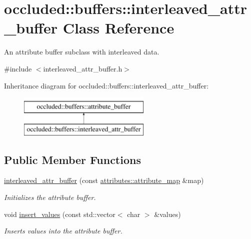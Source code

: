 \hypertarget{classoccluded_1_1buffers_1_1interleaved__attr__buffer}{\section{occluded\+:\+:buffers\+:\+:interleaved\+\_\+attr\+\_\+buffer Class Reference}
\label{classoccluded_1_1buffers_1_1interleaved__attr__buffer}
}


An attribute buffer subclass with interleaved data.  




{\ttfamily \#include $<$interleaved\+\_\+attr\+\_\+buffer.\+h$>$}

Inheritance diagram for occluded\+:\+:buffers\+:\+:interleaved\+\_\+attr\+\_\+buffer\+:\begin{figure}[H]
\begin{center}
\leavevmode
\includegraphics[height=2.000000cm]{classoccluded_1_1buffers_1_1interleaved__attr__buffer}
\end{center}
\end{figure}
\subsection*{Public Member Functions}
\begin{DoxyCompactItemize}
\item 
\hyperlink{classoccluded_1_1buffers_1_1interleaved__attr__buffer_af40be210a1b5468d1696e1cb1e9f663b}{interleaved\+\_\+attr\+\_\+buffer} (const \hyperlink{classoccluded_1_1buffers_1_1attributes_1_1attribute__map}{attributes\+::attribute\+\_\+map} \&map)
\begin{DoxyCompactList}\small\item\em Initializes the attribute buffer. \end{DoxyCompactList}\item 
void \hyperlink{classoccluded_1_1buffers_1_1interleaved__attr__buffer_a7347f20462c3bb9744602fc159e54e00}{insert\+\_\+values} (const std\+::vector$<$ char $>$ \&values)
\begin{DoxyCompactList}\small\item\em Inserts values into the attribute buffer. \end{DoxyCompactList}\end{DoxyCompactItemize}
